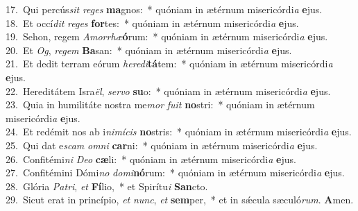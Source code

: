 {17.~}Qui percús\textit{sit} \textit{re}\textit{ges} \textbf{ma}gnos:~* quóniam in ætérnum misericórdi\textit{a} \textbf{e}jus.\\
{18.~}Et occí\textit{dit} \textit{re}\textit{ges} \textbf{for}tes:~* quóniam in ætérnum misericórdi\textit{a} \textbf{e}jus.\\
{19.~}Sehon, regem \textit{A}\textit{mor}\textit{rhæ}\textbf{ó}rum:~* quóniam in ætérnum misericórdi\textit{a} \textbf{e}jus.\\
{20.~}Et \textit{Og}, \textit{re}\textit{gem} \textbf{Ba}san:~* quóniam in ætérnum misericórdi\textit{a} \textbf{e}jus.\\
{21.~}Et dedit terram eórum \textit{he}\textit{re}\textit{di}\textbf{tá}tem:~* quóniam in ætérnum misericórdi\textit{a} \textbf{e}jus.\\
{22.~}Hereditátem Isra\textit{ël}, \textit{ser}\textit{vo} \textbf{su}o:~* quóniam in ætérnum misericórdi\textit{a} \textbf{e}jus.\\
{23.~}Quia in humilitáte nostra me\textit{mor} \textit{fu}\textit{it} \textbf{no}stri:~* quóniam in ætérnum misericórdi\textit{a} \textbf{e}jus.\\
{24.~}Et redémit nos ab i\textit{ni}\textit{mí}\textit{cis} \textbf{no}stris:~* quóniam in ætérnum misericórdi\textit{a} \textbf{e}jus.\\
{25.~}Qui dat e\textit{scam} \textit{om}\textit{ni} \textbf{car}ni:~* quóniam in ætérnum misericórdi\textit{a} \textbf{e}jus.\\
{26.~}Confitémi\textit{ni} \textit{De}\textit{o} \textbf{cæ}li:~* quóniam in ætérnum misericórdi\textit{a} \textbf{e}jus.\\
{27.~}Confitémini Dómi\textit{no} \textit{do}\textit{mi}\textbf{nó}rum:~* quóniam in ætérnum misericórdi\textit{a} \textbf{e}jus.\\
{28.~}Glória \textit{Pa}\textit{tri}, \textit{et} \textbf{Fí}lio,~* et Spirítu\textit{i} \textbf{San}cto.\\
{29.~}Sicut erat in princípio, \textit{et} \textit{nunc}, \textit{et} \textbf{sem}per,~* et in sǽcula sæculó\textit{rum}. \textbf{A}men.\\
